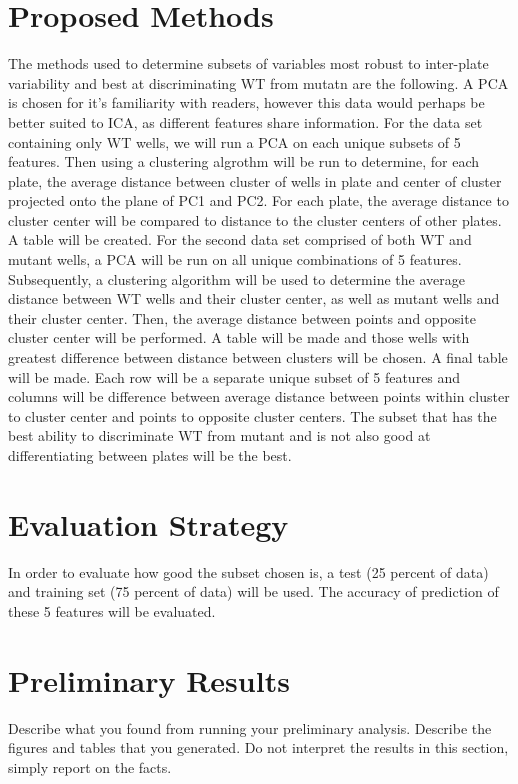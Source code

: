 \documentclass{article}\usepackage[]{graphicx}\usepackage[]{color}
\begin{document}
\section{Proposed Methods}
The methods used to determine subsets of variables most robust to inter-plate variability and best at discriminating WT from mutatn are the following.  A PCA is chosen for it's familiarity with readers, however this data would perhaps be better suited to ICA, as different features share information. For the data set containing only WT wells, we will run a PCA on each unique subsets of 5 features. Then using a clustering algrothm will be run to determine, for each plate, the average distance between cluster of wells in plate and center of cluster projected onto the plane of PC1 and PC2. For each plate, the average distance to cluster center will be compared to distance to the cluster centers of other plates. A table will be created. For the second data set comprised of both WT and mutant wells, a PCA will be run on all unique combinations of 5 features. Subsequently, a clustering algorithm will be used to determine the average distance between WT wells and their cluster center, as well as mutant wells and their cluster center. Then, the average distance between points and opposite cluster center will be performed. A table will be made and those wells with greatest difference between distance between clusters will be chosen. A final table will be made. Each row will be a separate unique subset of 5 features and columns will be difference between average distance between points within cluster to cluster center and points to opposite cluster centers. The subset that has the best ability to discriminate WT from mutant and is not also good at differentiating between plates will be the best.



\section{Evaluation Strategy}
In order to evaluate how good the subset chosen is, a test (25 percent of data) and training set (75 percent of data) will be used. The accuracy of prediction of these 5 features will be evaluated. 


\section{Preliminary Results}
Describe what you found from running your preliminary analysis. Describe the figures and tables that you generated. Do not interpret the results in this section, simply report on the facts.
\end{document}
